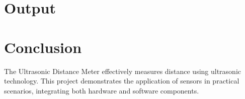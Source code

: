 \documentclass{article}
\begin{document}
\section*{Output}
\begin{center}
\end{center}

\section*{Conclusion}
The Ultrasonic Distance Meter effectively measures distance using ultrasonic technology. This project demonstrates the application of sensors in practical scenarios, integrating both hardware and software components.
\end{document}
